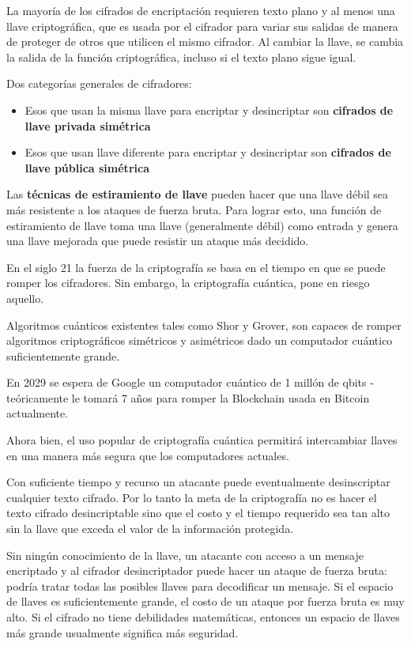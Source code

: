 La mayoría de los cifrados de encriptación requieren texto plano y al menos una llave criptográfica, que es usada por el cifrador para variar sus salidas de manera de proteger de otros que utilicen el mismo cifrador. Al cambiar la llave, se cambia la salida de la función criptográfica, incluso si el texto plano sigue igual. 


Dos categorías generales de cifradores:
\begin{itemize}
    \item Esos que usan la misma llave para encriptar y desincriptar son \textbf{cifrados de llave privada simétrica}
     \item Esos que usan  llave diferente para encriptar y desincriptar son \textbf{cifrados de llave pública simétrica}
\end{itemize}
\begin{tcolorbox}[colback=gray!5!white,colframe=orange!60!gray,title= llaves débiles y ataques]
Las \textbf{técnicas de estiramiento de llave} pueden hacer que una llave débil sea más resistente a los ataques de fuerza bruta. Para lograr esto, una función de estiramiento de llave toma una llave (generalmente débil) como entrada y genera una llave mejorada que puede resistir un ataque más decidido.
\end{tcolorbox}


En el siglo 21 la fuerza de la criptografía se basa en el tiempo en que se puede romper los cifradores. Sin embargo, la criptografía cuántica, pone en riesgo aquello. 

Algoritmos cuánticos existentes tales como Shor y Grover, son capaces de romper algoritmos criptográficos simétricos y asimétricos dado un computador cuántico suficientemente grande. 



En 2029 se espera de Google un computador cuántico de 1 millón de qbits - teóricamente le tomará 7 años para romper la Blockchain usada en Bitcoin actualmente. 


Ahora bien, el uso popular de criptografía cuántica permitirá intercambiar llaves en una manera más segura que los computadores actuales. 


Con suficiente tiempo y recurso un atacante puede eventualmente desinscriptar cualquier texto cifrado. Por lo tanto la meta de la criptografía no es hacer el texto cifrado  desincriptable sino que el costo y el tiempo requerido sea tan alto sin la llave que exceda el valor de la información protegida. 
\begin{tcolorbox}[colback=gray!5!white,colframe=orange!60!gray,title= ataques]
Sin ningún conocimiento de la llave, un atacante con acceso a un mensaje encriptado y al cifrador desincriptador puede hacer un ataque de fuerza bruta: podría tratar todas las posibles llaves para decodificar un mensaje. Si el espacio de llaves es suficientemente grande, el costo de un ataque por fuerza bruta es muy alto. Si el cifrado no tiene debilidades matemáticas, entonces un espacio de llaves más grande usualmente significa más seguridad. 
\end{tcolorbox}


